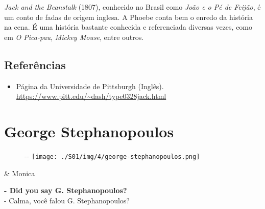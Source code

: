 \emph{Jack and the Beanstalk} (1807), conhecido no Brasil como
\emph{João e o Pé de Feijão}, é um conto de fadas de origem inglesa. A
Phoebe conta bem o enredo da história na cena. É uma história bastante
conhecida e referenciada diversas vezes, como em \emph{O Pica-pau},
\emph{Mickey Mouse}, entre outros.

\hypertarget{referuxeancias-2}{%
\subsection{Referências}\label{referuxeancias-2}}

\begin{itemize}
\tightlist
\item
  \sloppy Página da Universidade de Pittsburgh (Inglês). \url{https://www.pitt.edu/~dash/type0328jack.html}
\end{itemize}

\hypertarget{george-stephanopoulos}{%
\section{George Stephanopoulos}\label{george-stephanopoulos}}

\begin{figure}[!ht]
  \begin{adjustwidth}{-\oddsidemargin-1in}{-\rightmargin}
    \centering
    \texttt{[image: ./S01/img/4/george-stephanopoulos.png]}
  \end{adjustwidth}
\end{figure}

\begin{tcolorbox}[enhanced,center upper,
    drop fuzzy shadow southeast, boxrule=0.3pt,
    lower separated=false, breakable,
    colframe=black!30!dialogoBorder,colback=white]
\begin{minipage}[c]{0.16\linewidth}
   & \centering \scriptsize{Monica}
\end{minipage}
\hfill
\begin{minipage}[c]{0.8\linewidth}
  \textbf{- Did you say G. Stephanopoulos?}\\
  - Calma, você falou G. Stephanopoulos?
\end{minipage}
\end{tcolorbox}

